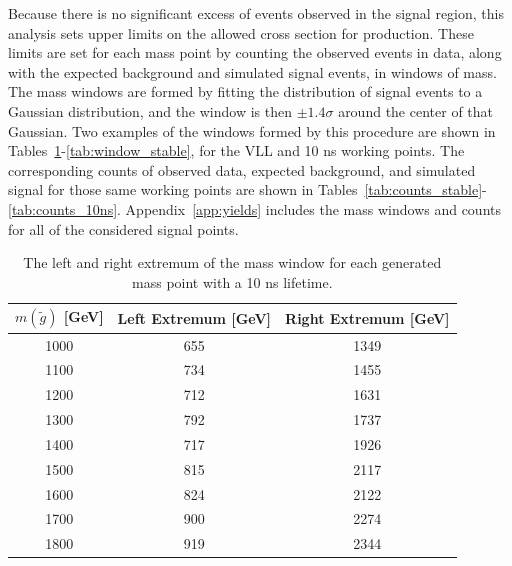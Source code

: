 Because there is no significant excess of events observed in the signal region, this analysis sets upper limits on the allowed cross section for \rhadron production.
These limits are set for each mass point by counting the observed events in data, along with the expected background and simulated signal events, in windows of mass.
The mass windows are formed by fitting the distribution of signal events to a Gaussian distribution, and the window is then $\pm 1.4\sigma$ around the center of that Gaussian.
Two examples of the windows formed by this procedure are shown in Tables~\ref{tab:window_10ns}-\ref{tab:window_stable}, for the \ac{VLL} and 10 ns working points.
The corresponding counts of observed data, expected background, and simulated signal for those same working points are shown in Tables~\ref{tab:counts_stable}-\ref{tab:counts_10ns}.
Appendix~\ref{app:yields} includes the mass windows and counts for all of the considered signal points.

\begin{table}[!htbp]
  \begin{center}
    \begin{tabular}{ccc}
        \hline
        $m(\tilde{g})$ [GeV]  & Left Extremum [GeV] & Right Extremum [GeV] \\
        \hline
        1000    & 655 & 1349 \\
        1100    & 734 & 1455 \\
        1200    & 712 & 1631 \\
        1300    & 792 & 1737 \\
        1400    & 717 & 1926 \\
        1500    & 815 & 2117 \\
        1600    & 824 & 2122 \\
        1700    & 900 & 2274 \\
        1800    & 919 & 2344 \\
        \hline
    \end{tabular}
  \end{center}
  \caption{The left and right extremum of the mass window for each generated mass point with a 10 ns lifetime.}
  \label{tab:window_10ns}
\end{table}

